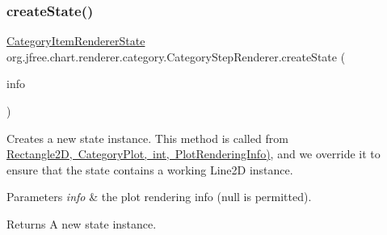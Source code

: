 \subsubsection{\texorpdfstring{create\+State()}{createState()}}
{\footnotesize\ttfamily \mbox{\hyperlink{classorg_1_1jfree_1_1chart_1_1renderer_1_1category_1_1_category_item_renderer_state}{Category\+Item\+Renderer\+State}} org.\+jfree.\+chart.\+renderer.\+category.\+Category\+Step\+Renderer.\+create\+State (\begin{DoxyParamCaption}\item[{\mbox{\hyperlink{classorg_1_1jfree_1_1chart_1_1plot_1_1_plot_rendering_info}{Plot\+Rendering\+Info}}}]{info }\end{DoxyParamCaption})\hspace{0.3cm}{\ttfamily [protected]}}

Creates a new state instance. This method is called from \mbox{\hyperlink{}{Rectangle2D, Category\+Plot, int, Plot\+Rendering\+Info)}}, and we override it to ensure that the state contains a working Line2D instance.


\begin{DoxyParams}{Parameters}
{\em info} & the plot rendering info ({\ttfamily null} is permitted).\\
\hline
\end{DoxyParams}
\begin{DoxyReturn}{Returns}
A new state instance. 
\end{DoxyReturn}
\mbox{\label{classorg_1_1jfree_1_1chart_1_1renderer_1_1category_1_1_category_step_renderer_aa2758ff5fa3b549e15cfb428a24c68ec}} 
